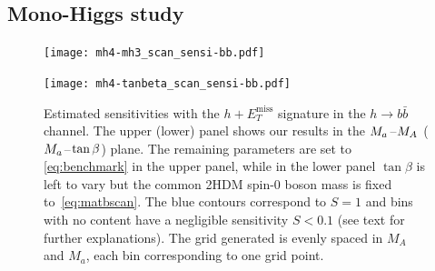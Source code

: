 \documentclass[a4paper, 11pt,notoc]{article}
\newcommand{\MET}{\ensuremath{E_T^\mathrm{miss}}\xspace}
\newcommand{\mA}{\ensuremath{M_{A}}\xspace}
\newcommand{\ma}{\ensuremath{M_{a}}\xspace}
\begin{document}
\subsection{Mono-Higgs study}
\label{sec:sensi_monohbb}

\begin{figure}[t!]
\centering
\texttt{[image: mh4-mh3\_scan\_sensi-bb.pdf]}

\vspace{2mm}

\texttt{[image: mh4-tanbeta\_scan\_sensi-bb.pdf]}
\vspace{2mm}
\caption{Estimated sensitivities with the $h+\MET$ signature in the $h \to b \bar b$ channel. The upper (lower) panel shows our results in the $\ma\hspace{0.25mm}$--$\hspace{0.25mm}\mA$ ($\ma\hspace{0.25mm}$--$\hspace{0.25mm}\tan \beta$) plane.  The remaining parameters are set to \eqref{eq:benchmark} in the upper panel, while in the lower panel $\tan \beta$ is left to vary but the common 2HDM  spin-0 boson  mass is fixed to~\eqref{eq:matbscan}. The blue contours correspond to $S =1$ and bins with no content have a negligible sensitivity $S<0.1$ (see text for further explanations). The grid generated is evenly spaced in \mA and \ma, each bin corresponding to one grid point.}
\label{fig:monoHbb_sensi}
\end{figure}
\end{document}
